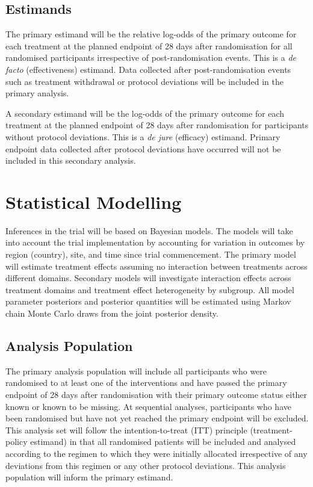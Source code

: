\documentclass[
  11pt,
]{article}
\begin{document}
\hypertarget{estimands}{%
\subsection{Estimands}\label{estimands}}

The primary estimand will be the relative log-odds of the primary outcome for each treatment at the planned endpoint of 28 days after randomisation for all randomised participants irrespective of post-randomisation events.
This is a \emph{de facto} (effectiveness) estimand.
Data collected after post-randomisation events such as treatment withdrawal or protocol deviations will be included in the primary analysis.

A secondary estimand will be the log-odds of the primary outcome for each treatment at the planned endpoint of 28 days after randomisation for participants without protocol deviations.
This is a \emph{de jure} (efficacy) estimand.
Primary endpoint data collected after protocol deviations have occurred will not be included in this secondary analysis.

\hypertarget{statistical-modelling}{%
\section{Statistical Modelling}\label{statistical-modelling}}

Inferences in the trial will be based on Bayesian models.
The models will take into account the trial implementation by accounting for variation in outcomes by region (country), site, and time since trial commencement.
The primary model will estimate treatment effects assuming no interaction between treatments across different domains.
Secondary models will investigate interaction effects across treatment domains and treatment effect heterogeneity by subgroup.
All model parameter posteriors and posterior quantities will be estimated using Markov chain Monte Carlo draws from the joint posterior density.

\hypertarget{analysis-population}{%
\subsection{Analysis Population}\label{analysis-population}}

The primary analysis population will include all participants who were randomised to at least one of the interventions and have passed the primary endpoint of 28 days after randomisation with their primary outcome status either known or known to be missing. At sequential analyses, participants who have been randomised but have not yet reached the primary endpoint will be excluded.
This analysis set will follow the intention-to-treat (ITT) principle (treatment-policy estimand) in that all randomised patients will be included and analysed according to the regimen to which they were initially allocated irrespective of any deviations from this regimen or any other protocol deviations. This analysis population will inform the primary estimand.
\end{document}
